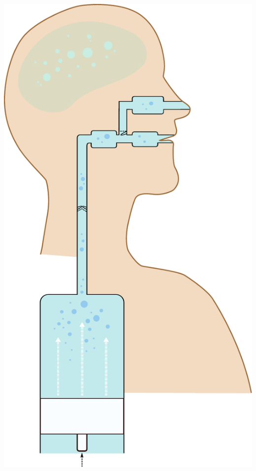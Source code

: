 \documentclass[9pt]{beamer}
\begin{document}
\begin{frame}[b]
{        \includegraphics[width=0.28\paperwidth]{tubes}
    }
\end{frame}
\end{document}
